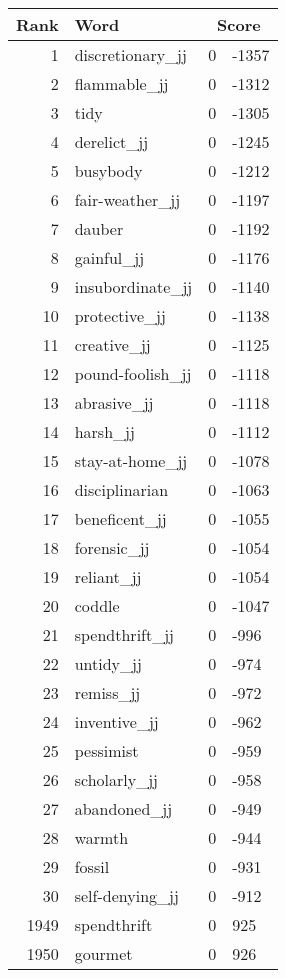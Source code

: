 \begin{longtable}[!htbp]{| rlr@{.}l |}
    \hline
    \textbf{Rank} & \textbf{Word} & \multicolumn{2}{c|}{\textbf{Score}} \\
    \hline
    \endhead
    1 & discretionary\_jj & 0 & -1357 \\
    2 & flammable\_jj & 0 & -1312 \\
    3 & tidy & 0 & -1305 \\
    4 & derelict\_jj & 0 & -1245 \\
    5 & busybody & 0 & -1212 \\
    6 & fair-weather\_jj & 0 & -1197 \\
    7 & dauber & 0 & -1192 \\
    8 & gainful\_jj & 0 & -1176 \\
    9 & insubordinate\_jj & 0 & -1140 \\
    10 & protective\_jj & 0 & -1138 \\
    11 & creative\_jj & 0 & -1125 \\
    12 & pound-foolish\_jj & 0 & -1118 \\
    13 & abrasive\_jj & 0 & -1118 \\
    14 & harsh\_jj & 0 & -1112 \\
    15 & stay-at-home\_jj & 0 & -1078 \\
    16 & disciplinarian & 0 & -1063 \\
    17 & beneficent\_jj & 0 & -1055 \\
    18 & forensic\_jj & 0 & -1054 \\
    19 & reliant\_jj & 0 & -1054 \\
    20 & coddle & 0 & -1047 \\
    21 & spendthrift\_jj & 0 & -996 \\
    22 & untidy\_jj & 0 & -974 \\
    23 & remiss\_jj & 0 & -972 \\
    24 & inventive\_jj & 0 & -962 \\
    25 & pessimist & 0 & -959 \\
    26 & scholarly\_jj & 0 & -958 \\
    27 & abandoned\_jj & 0 & -949 \\
    28 & warmth & 0 & -944 \\
    29 & fossil & 0 & -931 \\
    30 & self-denying\_jj & 0 & -912 \\
    1949 & spendthrift & 0 & 925 \\
    1950 & gourmet & 0 & 926 \\

\end{longtable}
